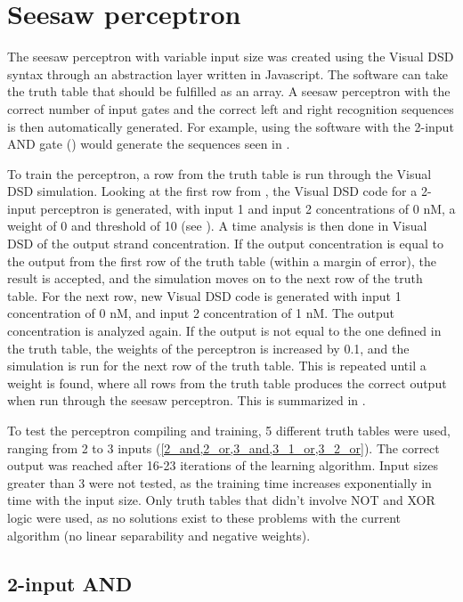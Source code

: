 
\section{Seesaw perceptron}

The seesaw perceptron with variable input size was created using the Visual DSD syntax through an abstraction layer written in Javascript. The software can take the truth table that should be fulfilled as an array. A seesaw perceptron with the correct number of input gates and the correct left and right recognition sequences is then automatically generated. For example, using the software with the 2-input AND gate () would generate the sequences seen in .

To train the perceptron, a row from the truth table is run through the Visual DSD simulation. Looking at the first row from , the Visual DSD code for a 2-input perceptron is generated, with input 1 and input 2 concentrations of 0 nM, a weight of 0 and threshold of 10 (see ). A time analysis is then done in Visual DSD of the output strand concentration. If the output concentration is equal to the output from the first row of the truth table (within a margin of error), the result is accepted, and the simulation moves on to the next row of the truth table. For the next row, new Visual DSD code is generated with input 1 concentration of 0 nM, and input 2 concentration of 1 nM. The output concentration is analyzed again. If the output is not equal to the one defined in the truth table, the weights of the perceptron is increased by 0.1, and the simulation is run for the next row of the truth table. This is repeated until a weight is found, where all rows from the truth table produces the correct output when run through the seesaw perceptron. This is summarized in .

To test the perceptron compiling and training, 5 different truth tables were used, ranging from 2 to 3 inputs (\cref{2_and,2_or,3_and,3_1_or,3_2_or}). The correct output was reached after 16-23 iterations of the learning algorithm. Input sizes greater than 3 were not tested, as the training time increases exponentially in time with the input size. Only truth tables that didn't involve NOT and XOR logic were used, as no solutions exist to these problems with the current algorithm (no linear separability and negative weights).


\subsection{2-input AND}


